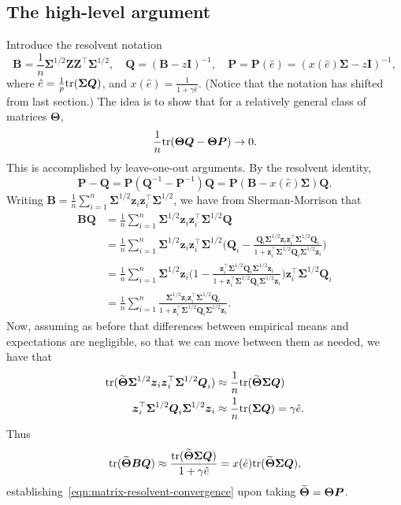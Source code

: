 \documentclass{article}
\newcommand{\bz}{\boldsymbol{z}}
\newcommand{\bSigma}{\boldsymbol{\Sigma}}
\newcommand{\bTheta}{\boldsymbol{\Theta}}
\newcommand{\bB}{\boldsymbol{B}}
\newcommand{\bQ}{\boldsymbol{Q}}
\newcommand{\bP}{\boldsymbol{P}}
\newcommand{\bI}{\boldsymbol{I}}
\newcommand{\bZ}{\boldsymbol{Z}}
\begin{document}
\subsection{The high-level argument}
Introduce the resolvent notation 
$$
\bB = \frac{1}{n} \bSigma^{1/2} \bZ \bZ^{\top} \bSigma^{1/2}, \quad \bQ = (\bB - z\bI)^{-1}, \quad \bP = \bP(\hat{e}) = (x(\hat{e})\bSigma - z\bI)^{-1},
$$
where $\hat{e} = \frac{1}{p}\tr(\bSigma \bQ)$, and $x(\hat{e}) = \frac{1}{1 + \gamma \hat{e}}$. (Notice that the notation has shifted from last section.) The idea is to show that for a relatively general class of matrices $\bTheta$,
\begin{equation}
	\label{eqn:matrix-resolvent-convergence}
	\frac{1}{n}\tr(\bTheta \bQ- \bTheta \bP) \to 0.
\end{equation}
This is accomplished by leave-one-out arguments. By the resolvent identity,
$$
\bP - \bQ = \bP (\bQ^{-1} - \bP^{-1}) \bQ = \bP (\bB - x(\hat{e})\bSigma) \bQ. 
$$
Writing $\bB = \frac{1}{n}\sum_{i = 1}^{n} \bSigma^{1/2} \bz_i \bz_i^{\top} \bSigma^{1/2}$, we have from Sherman-Morrison that
\begin{align*}
\bB \bQ 
& = \frac{1}{n}\sum_{i = 1}^{n} \bSigma^{1/2} \bz_i \bz_i^{\top}  \bSigma^{1/2}  \bQ \\
& = \frac{1}{n}\sum_{i = 1}^{n} \bSigma^{1/2} \bz_i \bz_i^{\top}  \bSigma^{1/2}  \Big(\bQ_i - \frac{\bQ_i \bSigma^{1/2} \bz_i \bz_i^{\top}  \bSigma^{1/2} \bQ_i}{1 + \bz_i^{\top} \bSigma^{1/2} \bQ_i \bSigma^{1/2} \bz_i}\Big) \\
& = \frac{1}{n}\sum_{i = 1}^{n} \bSigma^{1/2} \bz_i  \Big(1 - \frac{\bz_i^{\top}  \bSigma^{1/2} \bQ_i \bSigma^{1/2} \bz_i }{1 + \bz_i^{\top} \bSigma^{1/2} \bQ_i \bSigma^{1/2} \bz_i}\Big) \bz_i^{\top}  \bSigma^{1/2} \bQ_i \\
& = \frac{1}{n}\sum_{i = 1}^{n} \frac{\bSigma^{1/2} \bz_i \bz_i^{\top}  \bSigma^{1/2} \bQ_i}{{1 + \bz_i^{\top} \bSigma^{1/2} \bQ_i \bSigma^{1/2} \bz_i}}.
\end{align*}
Now, assuming as before that differences between empirical means and expectations are negligible, so that we can move between them as needed, we have that
\begin{align*}
\tr(\wt{\bTheta} \bSigma^{1/2} \bz_i \bz_i^{\top}  \bSigma^{1/2} \bQ_i) & \approx \frac{1}{n}\tr(\wt{\bTheta} \bSigma \bQ) \\
\bz_i^{\top} \bSigma^{1/2} \bQ_i \bSigma^{1/2} \bz_i & \approx \frac{1}{n}\tr(\bSigma \bQ) = \gamma \hat{e}.
\end{align*}
Thus 
$$
\tr(\wt{\bTheta} \bB \bQ) \approx \frac{\tr(\wt{\bTheta} \bSigma \bQ)}{1 + \gamma \hat{e}} =  x(\hat{e}) \tr(\wt{\bTheta} \bSigma \bQ),
$$
establishing~\eqref{eqn:matrix-resolvent-convergence} upon taking $\wt{\bTheta} = \bTheta \bP$. 
\end{document}
